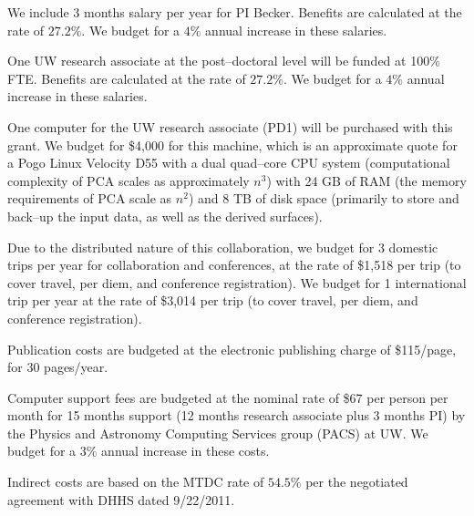 \bigskip {} We include 3 months salary per year for PI
Becker. Benefits are calculated at the rate of $27.2\%$.  We budget for a $4\%$
annual increase in these salaries.

\bigskip {} One UW research associate at the
post--doctoral level will be funded at 100\% FTE.  Benefits are calculated at
the rate of $27.2\%$.  We budget for a $4\%$ annual increase in these salaries.

\bigskip {} One computer for the UW research associate
(PD1) will be purchased with this grant. We budget for \$4,000 for this machine,
which is an approximate quote for a Pogo Linux Velocity D55 with a dual
quad--core CPU system (computational complexity of PCA scales as approximately
$n^3$) with 24 GB of RAM (the memory requirements of PCA scale as $n^2$) and 8
TB of disk space (primarily to store and back--up the input data, as well as the
derived surfaces).

\bigskip {} Due to the distributed nature of this
collaboration, we budget for 3 domestic trips per year for collaboration and
conferences, at the rate of \$1,518 per trip (to cover travel, per diem, and
conference registration).  We budget for 1 international trip per year at the
rate of \$3,014 per trip (to cover travel, per diem, and conference
registration).

\bigskip {} Publication costs are budgeted at
the electronic publishing charge of \$115/page, for 30 pages/year.

\bigskip {} Computer support fees are budgeted at
the nominal rate of \$67 per person per month for 15 months support (12 months
research associate plus 3 months PI) by the Physics and Astronomy Computing
Services group (PACS) at UW.  We budget for a $3\%$ annual increase in these
costs.

\bigskip {} Indirect costs are based on the MTDC rate of
$54.5\%$ per the negotiated agreement with DHHS dated 9/22/2011.
